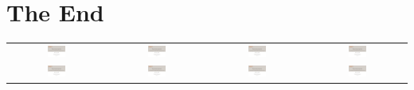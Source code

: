 \documentclass[compress,aspectratio=1610]{beamer}
\begin{document}
\section*{The End}
\begin{frame}
  \begin{center}
    \vspace{-1cm}
    \begin{tabular}{cccc}
      \includegraphics[page=3, width=0.2\textwidth]{figures/End.pdf} &
      \includegraphics[page=4, width=0.2\textwidth]{figures/End.pdf} &
      \includegraphics[page=5, width=0.2\textwidth]{figures/End.pdf} &
      \includegraphics[page=6, width=0.2\textwidth]{figures/End.pdf} \\

      \includegraphics[page=7, width=0.2\textwidth]{figures/End.pdf} &
      \includegraphics[page=8, width=0.2\textwidth]{figures/End.pdf} &
      \includegraphics[page=9, width=0.2\textwidth]{figures/End.pdf} &
      \includegraphics[page=10, width=0.2\textwidth]{figures/End.pdf} \\


\end{tabular}
\end{center}
\end{frame}
\end{document}
